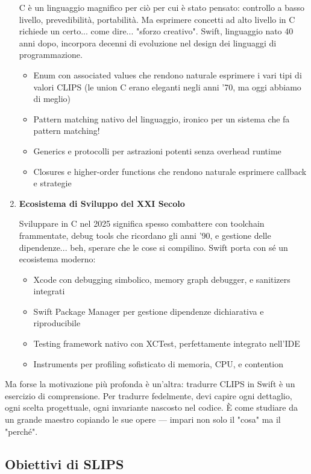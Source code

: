 \begin{enumerate}
C è un linguaggio magnifico per ciò per cui è stato pensato: controllo a basso livello, prevedibilità, portabilità. Ma esprimere concetti ad alto livello in C richiede un certo... come dire... "sforzo creativo". Swift, linguaggio nato 40 anni dopo, incorpora decenni di evoluzione nel design dei linguaggi di programmazione.

\begin{itemize}
\item Enum con associated values che rendono naturale esprimere i vari tipi di valori CLIPS (le union C erano eleganti negli anni '70, ma oggi abbiamo di meglio)
\item Pattern matching nativo del linguaggio, ironico per un sistema che fa pattern matching!
\item Generics e protocolli per astrazioni potenti senza overhead runtime
\item Closures e higher-order functions che rendono naturale esprimere callback e strategie
\end{itemize}

\item \textbf{Ecosistema di Sviluppo del XXI Secolo}

Sviluppare in C nel 2025 significa spesso combattere con toolchain frammentate, debug tools che ricordano gli anni '90, e gestione delle dipendenze... beh, sperare che le cose si compilino. Swift porta con sé un ecosistema moderno:

\begin{itemize}
\item Xcode con debugging simbolico, memory graph debugger, e sanitizers integrati
\item Swift Package Manager per gestione dipendenze dichiarativa e riproducibile
\item Testing framework nativo con XCTest, perfettamente integrato nell'IDE
\item Instruments per profiling sofisticato di memoria, CPU, e contention
\end{itemize}

\end{enumerate}

Ma forse la motivazione più profonda è un'altra: tradurre CLIPS in Swift è un esercizio di comprensione. Per tradurre fedelmente, devi capire ogni dettaglio, ogni scelta progettuale, ogni invariante nascosto nel codice. È come studiare da un grande maestro copiando le sue opere — impari non solo il "cosa" ma il "perché".

\subsection{Obiettivi di SLIPS}

